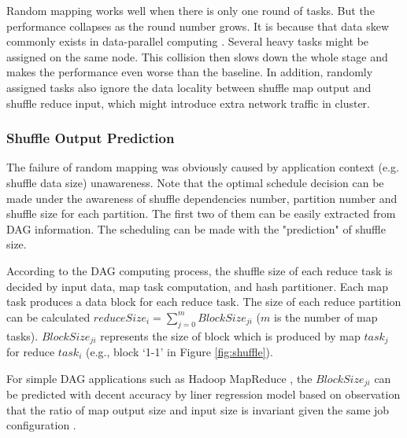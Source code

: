 Random mapping works well when there is only one round of tasks. But the performance collapses as the round number grows. It is because that data skew commonly exists in data-parallel computing \cite{skewtune, reining, gufler2012load}. Several heavy tasks might be assigned on the same node. This collision then slows down the whole stage and makes the performance even worse than the baseline. In addition, randomly assigned tasks also ignore the data locality between shuffle map output and shuffle reduce input, which might introduce extra network traffic in cluster.

\subsubsection{Shuffle Output Prediction}\label{shuffleprediction}
The failure of random mapping was obviously caused by application context (e.g. shuffle data size) unawareness. Note that the optimal schedule decision can be made under the awareness of shuffle dependencies number, partition number and shuffle size for each partition. The first two of them can be easily extracted from DAG information. The scheduling can be made with the "prediction" of shuffle size.

According to the DAG computing process, the shuffle size of each reduce task is decided by input data, map task computation, and hash partitioner. Each map task produces a data block for each reduce task. The size of each reduce partition can be calculated $reduceSize_i = \sum_{j=0}^{m} {BlockSize_{ji}}$ ($m$ is the number of map tasks). $BlockSize_{ji}$ represents the size of block which is produced by map $task_j$ for reduce $task_i$ (e.g., block `1-1' in Figure \ref{fig:shuffle}).

For simple DAG applications such as Hadoop MapReduce \cite{mapreduce}, the $BlockSize_{ji}$ can be predicted with decent accuracy by liner regression model based on observation that the ratio of map output size and input size is invariant given the same job configuration \cite{ishuffle, predict}.


